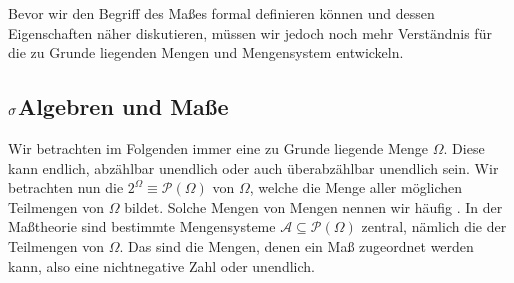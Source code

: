 \documentclass[letterpaper,10pt,english]{jupyterBook}
\begin{document}
\sphinxAtStartPar
Bevor wir den Begriff des Maßes formal definieren können und dessen Eigenschaften näher diskutieren, müssen wir jedoch noch mehr Verständnis für die zu Grunde liegenden Mengen und Mengensystem entwickeln.


\subsection{\protect\(\sigma\protect\)\sphinxhyphen{}Algebren und Maße}
\label{\detokenize{masstheorie/masstheorie:sigma-algebren-und-masze}}
\sphinxAtStartPar
Wir betrachten im Folgenden immer eine zu Grunde liegende Menge \(\Omega\).
Diese kann endlich, abzählbar unendlich oder auch überabzählbar unendlich sein.
Wir betrachten nun die  \(2^\Omega \equiv\mathcal{P}(\Omega)\) von \(\Omega\), welche die Menge aller möglichen Teilmengen von \(\Omega\) bildet.
Solche Mengen von Mengen nennen wir häufig .
In der Maßtheorie sind bestimmte Mengensysteme \(\mathcal{A} \subseteq \mathcal{P}(\Omega)\) zentral, nämlich die der  Teilmengen von \(\Omega\).
Das sind die Mengen, denen ein Maß zugeordnet werden kann, also eine nichtnegative Zahl oder unendlich.
\end{document}
